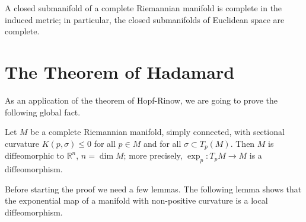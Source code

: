 \begin{corollary}
  \label{cor:dc-ch7-2-10}
  A closed submanifold of a complete Riemannian manifold is complete in the induced
  metric; in particular, the closed submanifolds of Euclidean space are complete.
\end{corollary}

\section{The Theorem of Hadamard}

As an application of the theorem of Hopf-Rinow, we are going to prove the
following global fact.

\begin{theorem}[Hadamard]
  \label{thm:dc-ch7-3-1}
  Let $M$ be a complete Riemannian manifold, simply connected, with sectional
  curvature $K(p,\sigma)\le 0$ for all $p\in M$ and for all $\sigma\subset T_p(M)$.
  Then $M$ is diffeomorphic to $\mathbb{R}^n$, $n=\dim M$; more precisely,
  $\exp_p:T_pM\to M$ is a diffeomorphism.
  
  Before starting the proof we need a few lemmas. The following lemma shows that the
  exponential map of a manifold with non-positive curvature is a local
  diffeomorphism.
\end{theorem}

